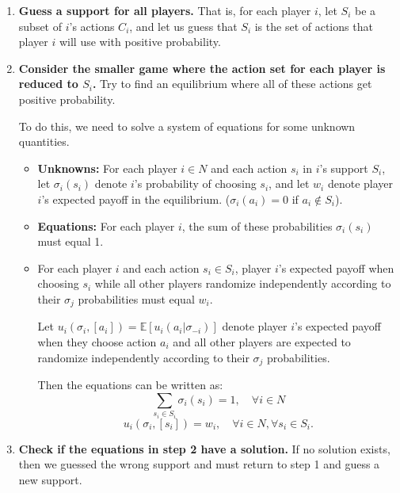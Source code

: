 \documentclass{article}
\begin{document}
\begin{enumerate}
    \item \textbf{Guess a support for all players.} That is, for each player \( i \), let \( S_i \) be a subset of \( i \)'s actions \( C_i \), and let us guess that \( S_i \) is the set of actions that player \( i \) will use with positive probability.

    \item \textbf{Consider the smaller game where the action set for each player is reduced to \( S_i \).} Try to find an equilibrium where all of these actions get positive probability.
    
    To do this, we need to solve a system of equations for some unknown quantities.

    \begin{itemize}
        \item \textbf{Unknowns:} For each player \( i \in N \) and each action \( s_i \) in \( i \)'s support \( S_i \), let \( \sigma_i(s_i) \) denote \( i \)'s probability of choosing \( s_i \), and let \( w_i \) denote player \( i \)'s expected payoff in the equilibrium. (\(\sigma_i(a_i) = 0\) if \( a_i \notin S_i \)).
        
        \item \textbf{Equations:} For each player \( i \), the sum of these probabilities \( \sigma_i(s_i) \) must equal 1.
        
        \item For each player \( i \) and each action \( s_i \in S_i \), player \( i \)'s expected payoff when choosing \( s_i \) while all other players randomize independently according to their \( \sigma_j \) probabilities must equal \( w_i \).

        Let \( u_i(\sigma_i, [a_i]) = \mathbb{E}[u_i(a_i | \sigma_{-i})] \) denote player \( i \)'s expected payoff when they choose action \( a_i \) and all other players are expected to randomize independently according to their \( \sigma_j \) probabilities.

        Then the equations can be written as:
        \[
        \sum_{s_i \in S_i} \sigma_i(s_i) = 1, \quad \forall i \in N
        \]
        \[
        u_i(\sigma_i, [s_i]) = w_i, \quad \forall i \in N, \forall s_i \in S_i.
        \]
    \end{itemize}

    \item \textbf{Check if the equations in step 2 have a solution.} If no solution exists, then we guessed the wrong support and must return to step 1 and guess a new support.


\end{enumerate}
\end{document}
